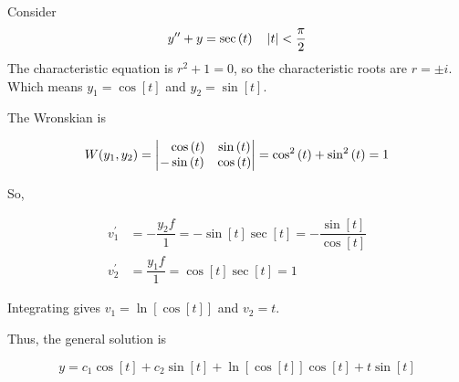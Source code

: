 \documentclass{beamer}
\begin{document}
\begin{frame}
\begin{example}
Consider
\begin{equation*}
y^{\prime\prime}+y=\sec[t] \quad \abs{t}<\dfrac{\pi}{2}
\end{equation*}\pause
The characteristic equation is $r^2+1=0$, so the characteristic roots are $r=\pm i$. Which means $y_1=\cos[t]$ and $y_2=\sin[t]$.\pause

\vspace{2mm}
The Wronskian is

\vspace{-4mm}
\begin{equation*}
W(y_1, y_2)=
\begin{vmatrix}
\+\cos[t] & \sin[t] \\
 -\sin[t] & \cos[t] \\
\end{vmatrix}
=\cos[t][2]+\sin[t][2]=1
\end{equation*}\pause

\vspace{-3mm}
So,

\vspace{-5mm}
\begin{equation*}
\begin{aligned}
v_1^\prime &= -\dfrac{y_2 f}{1} = -\sin[t]\sec[t]=-\dfrac{\sin[t]}{\cos[t]} \\
v_2^\prime &= \dfrac{y_1 f}{1} = \cos[t]\sec[t] = 1
\end{aligned}
\end{equation*}\pause

\vspace{-2mm}
Integrating gives $v_1=\ln[\cos[t]]$ and $v_2=t$.\pause

\vspace{2mm}
Thus, the general solution is

\vspace{-4mm}
\begin{equation*}
y=c_1\cos[t]+c_2\sin[t]+\ln[\cos[t]]\cos[t]+t\sin[t]
\end{equation*}
\end{example}
\end{frame}
\end{document}
